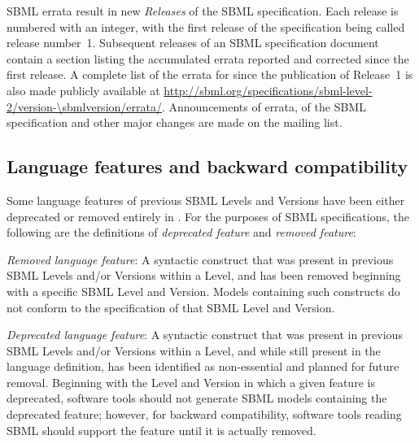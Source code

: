 SBML errata result in new \emph{Releases} of the SBML
specification.  Each release is numbered with an integer, with the
first release of the specification being called release number~1.
Subsequent releases of an SBML specification document contain a
section listing the accumulated errata reported and corrected
since the first release.  A complete list of the errata for
\changed{\sbmltwothree} since the publication of Release~1 is also
made publicly available at
\url{http://sbml.org/specifications/sbml-level-2/version-\sbmlversion/errata/}.
Announcements of errata,  of the SBML specification
and other major changes are made on the
 mailing
list.


\subsection{Language features and backward compatibility}
\label{sec:deprecated-features}

Some language features of previous SBML Levels and Versions have
been either deprecated or removed entirely in \changed{\sbmltwothree}.  For
the purposes of SBML specifications, the following are the
definitions of \emph{deprecated feature} and \emph{removed
  feature}:
\begin{description}
  
\item \emph{Removed language feature}: A syntactic construct that
  was present in previous SBML Levels and/or Versions within a
  Level, and has been removed beginning with a specific SBML Level
  and Version.  Models containing such constructs do not conform
  to the specification of that SBML Level and Version.
  
\item \emph{Deprecated language feature}: A syntactic construct
  that was present in previous SBML Levels and/or Versions within
  a Level, and while still present in the language definition, has
  been identified as non-essential and planned for future removal.
  Beginning with the Level and Version in which a given feature is
  deprecated, software tools should not generate SBML models
  containing the deprecated feature; however, for backward
  compatibility, software tools reading SBML should support the
  feature until it is actually removed.

\end{description}

